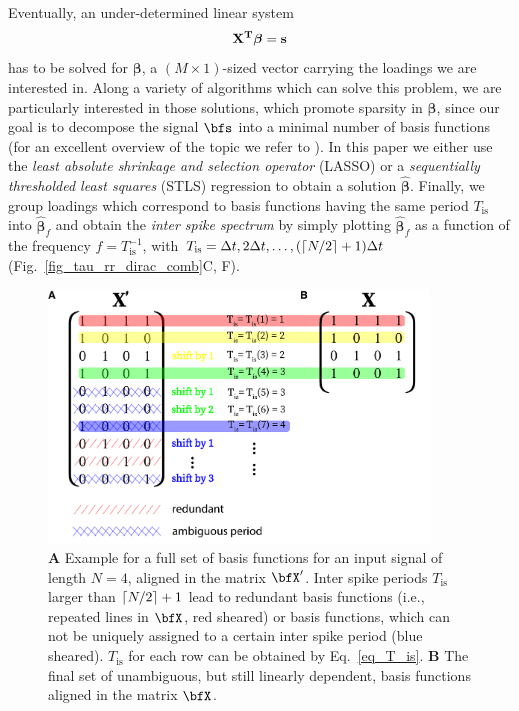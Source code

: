 \documentclass[entropy,article,submit,pdftex,moreauthors]{Definitions/mdpi}
\DeclarePairedDelimiter\ceil{\lceil}{\rceil}
\begin{document}
\noindent Eventually, an under-determined linear system
\begin{equation}
\bf{X}^T \boldsymbol\beta=\bf{s}
\label{eq_linear_system}
\end{equation}  
has to be solved for $\boldsymbol\beta$, a $(M\times 1)$-sized vector carrying the loadings we are interested in. Along a variety of algorithms which can solve this problem, we are 
particularly interested in those solutions, which promote sparsity in $\boldsymbol\beta$, since our goal is to decompose the signal $\bfs$ into a minimal number of basis 
functions (for an excellent overview of the topic we refer to \citet{Brunton2019}). In this paper we either use the \textit{least absolute shrinkage and selection operator} 
(LASSO) \cite{Tibshirani1996} or a \textit{sequentially thresholded least squares} (STLS) regression \cite{Brunton2016,Brunton2019} to obtain a solution $\hat{\boldsymbol\beta}$. Finally, we group loadings 
which correspond to basis functions having the same period 
$T_\text{is}$ into $\hat{\boldsymbol\beta}_f$ and obtain the 
\textit{inter spike spectrum} by simply plotting $\hat{\boldsymbol\beta}_f$ as a function of the frequency $f=T_\text{is}^{-1}$, with $T_\text{is}=\Delta t, 2\Delta t, \dots, (\ceil*{N/2}+1) \Delta t$ 
(Fig.~\ref{fig_tau_rr_dirac_comb}C, F).

\begin{figure}
\centering
\includegraphics[width=0.9\textwidth]{./figures/fig_tau_rr_basis_functions}
\caption{\textbf{A} Example for a full set of basis functions for an input signal of length $N=4$, aligned in the matrix $\bfX'$. Inter spike periods $T_{\text{is}}$ larger 
than $\ceil*{N/2}+1$ lead to redundant basis functions (i.e., repeated lines in $\bfX$, red sheared) or basis functions, which can not be uniquely assigned to a certain inter spike period 
(blue sheared). $T_{\text{is}}$ for each row can be obtained by Eq.~\eqref{eq_T_is}. \textbf{B} The final set of unambiguous, but still linearly dependent, basis functions aligned in the matrix $\bfX$.} \label{fig_tau_rr_basis_functions}
\end{figure}
\end{document}
